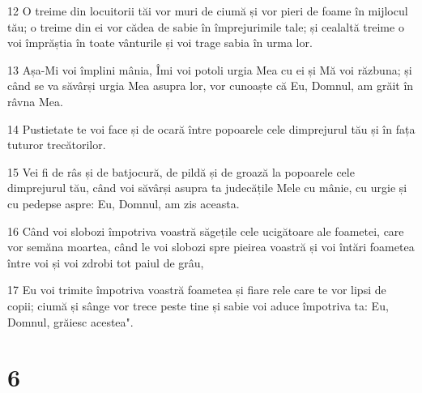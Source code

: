 \par 12 O treime din locuitorii tăi vor muri de ciumă și vor pieri de foame în mijlocul tău; o treime din ei vor cădea de sabie în împrejurimile tale; și cealaltă treime o voi împrăștia în toate vânturile și voi trage sabia în urma lor.
\par 13 Așa-Mi voi împlini mânia, Îmi voi potoli urgia Mea cu ei și Mă voi răzbuna; și când se va săvârși urgia Mea asupra lor, vor cunoaște că Eu, Domnul, am grăit în râvna Mea.
\par 14 Pustietate te voi face și de ocară între popoarele cele dimprejurul tău și în fața tuturor trecătorilor.
\par 15 Vei fi de râs și de batjocură, de pildă și de groază la popoarele cele dimprejurul tău, când voi săvârși asupra ta judecățile Mele cu mânie, cu urgie și cu pedepse aspre: Eu, Domnul, am zis aceasta.
\par 16 Când voi slobozi împotriva voastră săgețile cele ucigătoare ale foametei, care vor semăna moartea, când le voi slobozi spre pieirea voastră și voi întări foametea între voi și voi zdrobi tot paiul de grâu,
\par 17 Eu voi trimite împotriva voastră foametea și fiare rele care te vor lipsi de copii; ciumă și sânge vor trece peste tine și sabie voi aduce împotriva ta: Eu, Domnul, grăiesc acestea".

\chapter{6}

